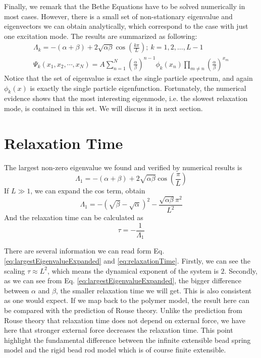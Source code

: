 \documentclass[12pt,a4paper]{article}
\begin{document}
Finally, we remark that the Bethe Equations have to be solved numerically in
most cases. However, there is a small set of non-stationary eigenvalue and
eigenvectors we can obtain analytically, which correspond to the case with
just one excitation mode. The results are summarized as following:  
\begin{subequations}
    \label{eq:eigenN}
    \begin{eqnarray}
        \label{eq:partEigenvaluesN}
        \Lambda_k  = 
        -(\alpha+\beta) + 2\sqrt{\alpha\beta}\cos(\frac{k\pi}{L});
        ~k=1,2,\dots, L-1  \\
        \label{eq:eigenvectorsN}
        \Psi_k(x_1, x_2, \cdots, x_N)  =  A \sum_{n=1}^N
        \left(\frac{\alpha}{\beta}\right)^{n-1} \phi_k(x_n)\prod_{m\neq n} 
         \left(\frac{\alpha}{\beta}\right)^{x_m}
    \end{eqnarray}
\end{subequations}
Notice that the set of eigenvalue is exact the single particle spectrum, and
again $\phi_k(x)$ is exactly the single particle eigenfunction.
Fortunately, the numerical evidence shows that the most interesting
eigenmode, i.e. the slowest relaxation mode, is contained in this set. 
We will discuss it in next section. 

\section{Relaxation Time}
\label{sec:relaxation_time}

The largest non-zero eigenvalue we found and verified by numerical results is 
\begin{equation}
    \label{eq:largestEigenvalue}
    \Lambda_1 = -(\alpha+\beta) +
    2\sqrt{\alpha\beta}\cos(\frac{\pi}{L})
\end{equation}
If $L \gg 1$, we can expand the cos term, obtain 
\begin{equation}
    \label{eq:largestEigenvalueExpanded}
    \Lambda_1 = -(\sqrt{\beta}-\sqrt{\alpha})^2 -
    \frac{\sqrt{\alpha\beta}\pi^2}{L^2}
\end{equation}
And the relaxation time can be calculated as 
\begin{equation}
    \label{eq:relaxationTime}
    \tau = -\frac{1}{\Lambda_1}
\end{equation}

There are several information we can read form Eq.
\eqref{eq:largestEigenvalueExpanded} and \eqref{eq:relaxationTime}. Firstly, we
can see the scaling $\tau \approx L^2$, which means the dynamical exponent of
the system is $2$. Secondly, as we can see from Eq.
\eqref{eq:largestEigenvalueExpanded}, the bigger difference between $\alpha$
and $\beta$, the smaller relaxation time we will get. This is also consistent
as one would expect. If we map back to the polymer model, the result here can
be compared with the prediction of Rouse theory. Unlike the prediction
from Rouse theory that relaxation time does not depend on external force, we
have here that stronger external force decreases the relaxation time. This
point highlight the fundamental difference between the infinite extensible bead
spring model and the rigid bead rod model which is of course finite extensible. 
\end{document}
